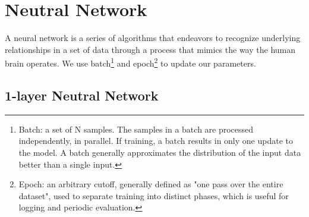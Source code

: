 \documentclass[8pt]{beamer}
\let\oldfootnote\footnote
\renewcommand\footnote[1][]{\oldfootnote[frame,#1]}
\begin{document}
\section{Neutral Network}\label{nn}
\begin{frame}[allowframebreaks]{\secname}
A neural network is a series of algorithms that endeavors to recognize underlying relationships in a set of data through a process that mimics the way the human brain operates.
We use batch\footnote{Batch: a set of N samples. The samples in a batch are processed independently, in parallel. If training, a batch results in only one update to the model.
A batch generally approximates the distribution of the input data better than a single input.} and epoch\footnote{Epoch: an arbitrary cutoff, generally defined as "one pass over the entire dataset", used to separate training into distinct phases, which is useful for logging and periodic evaluation.} to update our parameters\cite{chollet2015keras}.
\end{frame}



\subsection{1-layer Neutral Network}
\end{document}
